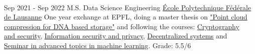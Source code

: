 \begin{paracol}{2}
\begin{leftcolumn}
\end{leftcolumn}
\begin{rightcolumn}
 \\[14pt]
\vspace{-12pt}



\vfill\null
{}

\cvevent
{Sep 2021 - Sep 2022}
{M.S. Data Science Engineering}
{\href{https://www.epfl.ch}{École Polytechnique Fédérale de Lausanne}}
{One year exchange at EPFL, doing a master thesis on \href{https://github.com/romaingrx/dna-pcc-master-project}{"Point cloud compression for DNA based storage"} and following the courses: 
    \href{https://edu.epfl.ch/coursebook/en/cryptography-and-security-COM-401}{Cryptography and security}, 
    \href{https://edu.epfl.ch/coursebook/en/information-security-and-privacy-COM-402}{Information security and privacy},
    \href{https://edu.epfl.ch/coursebook/en/decentralized-systems-engineering-CS-438}{Decentralized systems} and
    \href{https://edu.epfl.ch/coursebook/en/eecs-seminar-advanced-topics-in-machine-learning-ENG-704}{Seminar in advanced topics in machine learning}. Grade: 5.5/6}
{}
{}
{}


\end{rightcolumn}
\end{paracol}
